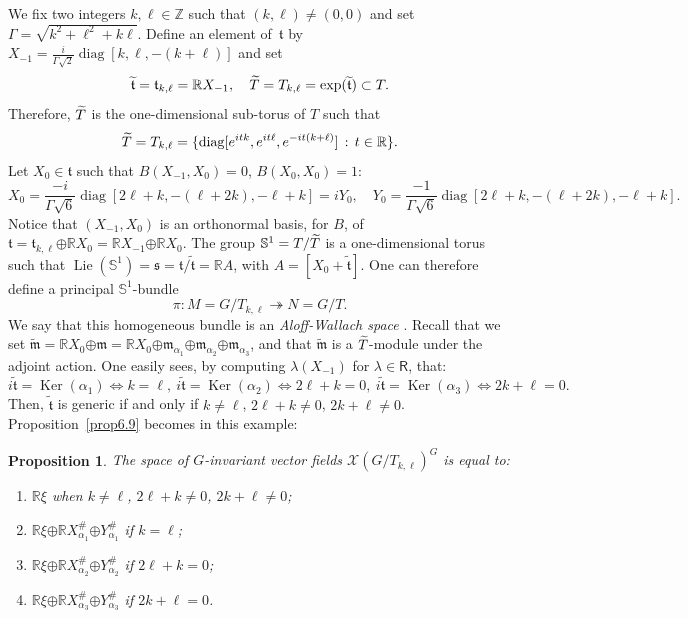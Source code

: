 \documentclass[a4paper,reqno]{amsart}
\newtheorem{prop}[thm]{Proposition}
\theoremstyle{definition}
\theoremstyle{remark}
\theoremstyle{plain}
\numberwithin{equation}{section}
\newcommand{\R}{{\mathbb{R}}}
\newcommand{\Z}{{\mathbb{Z}}}
\newcommand{\bbS}{{\mathbb{S}}}
\newcommand{\calX}{{\mathcal{X}}}
\newcommand{\fm}{{\mathfrak{m}}}
\newcommand{\fs}{{\mathfrak{s}}}
\newcommand{\ft}{{\mathfrak{t}}}
\newcommand{\sto}{\twoheadrightarrow}
\def\Ker{\operatorname {Ker}}
\def\Lie{\operatorname {Lie}}
\def\diag{\operatorname {diag}}
\def\boplus{\mathbin{\boldsymbol{\oplus}}}
\newcommand{\roots}{\mathsf{R}}
\newcommand{\Mt}{{\widetilde{M}}}
\newcommand{\wt}{{\widetilde{\mathfrak{t}}}}
\newcommand{\wm}{{\widetilde{\mathfrak{m}}}}
\newcommand{\ftkl}{\mathfrak{t}_{k,\ell}}
\newcommand{\Tkl}{{T}_{k,\ell}}
\begin{document}
We fix two integers $k,\ell \in \Z$ such that $(k,\ell) \neq (0,0)$ and set  $\Gamma = \sqrt{k^2
  + \ell^2 + k\ell}$.
Define an  element of~$\ft$ by $X_{-1} =
\frac{i}{\Gamma\sqrt{2}} \diag[k,\ell, -(k +\ell)]$
and set
\[
\wt= \ft_{k,\ell} = \R X_{-1}, \quad \wT = T_{k,\ell} =
  \exp(\wt) \subset T.
\]
Therefore, ${\widetilde{T}}$ is the one-dimensional sub-torus of $T$ such that
\[
\wT= T_{k,\ell} = \{\diag[e^{itk}, e^{it\ell}, e^{-it(k+\ell)}] \, : \, t \in \R\}.
\]
Let $X_0 \in \ft $  such that $B(X_{-1},X_0) = 0$, $B(X_0,X_0) = 1$:
\begin{equation*}
  \label{eq5.4}
  X_0=
\frac{-i}{\Gamma\sqrt{6}} \diag[2\ell +k, -(\ell + 2k) , -\ell
+k] = iY_0, \quad  Y_0= 
\frac{-1}{\Gamma\sqrt{6}} \diag[2\ell +k, -(\ell + 2k) , -\ell
+k].
\end{equation*}
Notice that $(X_{-1},X_0)$ is an orthonormal basis, for $B$, of
$\ft = \ftkl \boplus \R X_0= \R X_{-1} \boplus \R X_0$.
The group  $\bbS^1= T/\wT$ is a one-dimensional torus
such that $\Lie(\bbS^1) = \fs = \ft/\wt =\R A$, with $A = [X_0 + \wt]$.
One can therefore define a principal $\bbS^1$-bundle
\[
\pi :  M=G/\Tkl \sto N =G/T.
\]
We say that this homogeneous  bundle is  an \emph{Aloff-Wallach 
  space} \cite{AW}. %
Recall that we set
$\wm= \R X_0 \boplus \fm = \R X_0 \boplus \fm_{\alpha_1} \boplus
\fm_{\alpha_2} \boplus \fm_{\alpha_3}$,
and that $\wm$ is a ${\widetilde{T}}$-module under the adjoint action.
One easily sees, by computing
$\lambda(X_{-1})$ for $\lambda \in \roots$, that:
\begin{equation*} \label{eq5.2}
i\wt =\Ker(\alpha_1) \iff k =\ell, \  i\wt =\Ker(\alpha_2) \iff
2\ell +k=0, \  i\wt =\Ker(\alpha_3) \iff 2k +\ell =0.
\end{equation*}
Then, $\wt$ is generic if and only if $k \neq \ell$, $2\ell +
 k \neq 0$, $2k+\ell \neq 0$.  Proposition~\ref{prop6.9}
 becomes in this example: 

\begin{prop}
  \label{prop5.3}
   The space of $G$-invariant vector fields
   $\calX(G/T_{k,\ell})^G$ is equal to:
   \begin{enumerate}[{\rm \indent (1)}]
     \item $\R \xi$ when $k \neq \ell$, $2\ell +
 k \neq 0$, $2k+\ell \neq 0$; 
\item  $\R \xi \boplus \R
 X_{\alpha_1}^\# \boplus Y_{\alpha_1}^\#$ if $k=\ell$;
 \item  $\R \xi \boplus \R
 X_{\alpha_2}^\# \boplus Y_{\alpha_2}^\#$ if $2\ell +k =0$;
   \item $\R \xi \boplus \R
  X_{\alpha_3}^\# \boplus Y_{\alpha_3}^\#$ if $2k +\ell=0$.
  \end{enumerate}
\end{prop}
\end{document}
